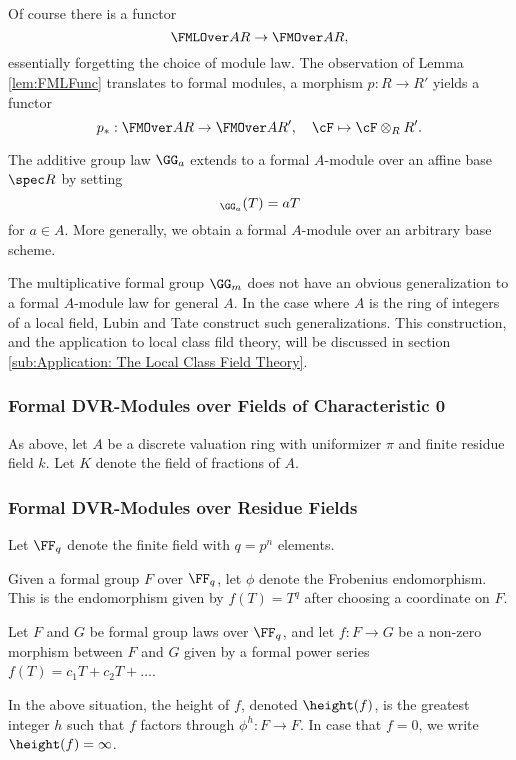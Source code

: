 Of course there is a functor 
\begin{equation*}
  \FMLOver AR \to \FMOver AR,
\end{equation*}
essentially forgetting the choice of module law. The observation of Lemma 
\ref{lem:FMLFunc} translates to formal modules, a morphism $p : R \to R'$ 
yields a functor 
\begin{equation*}
  p_*: \FMOver AR \to \FMOver A{R'}, \quad \cF \mapsto \cF \otimes_R R'.
\end{equation*}

\begin{xpl}
  The additive group law $\GG_a$ extends to a formal $A$-module over an affine base
  $\spec R$ by setting 
  \begin{equation*}
    [a]_{\GG_a}(T) = aT
  \end{equation*}
  for $a \in A$. More generally, we obtain a formal $A$-module over an arbitrary base
  scheme.

  The multiplicative formal group $\GG_m$ does not have an obvious 
  generalization to a formal $A$-module law for general $A$. In the case where $A$
  is the ring of integers of a local field, Lubin and Tate \cite{LubinTateFormalMult} 
  construct such generalizations. This construction, and the application to local
  class fild theory, will be discussed in section \ref{sub:Application: The
  Local Class Field Theory}.
\end{xpl}

\subsubsection{Formal DVR-Modules over Fields of Characteristic 0} %
\label{ssub:Formal DVR-Modules over Fields of Characteristic 0}
As above, let $A$ be a discrete valuation ring with uniformizer $\pi$ and finite 
residue field $k$. Let $K$ denote the field of fractions of $A$.

\subsubsection{Formal DVR-Modules over Residue Fields}
Let $\FF_q$ denote the finite field with $q = p^n$ elements.
\begin{defi}[Frobenius]
  Given a formal group $F$ over $\FF_q$, let $\phi$ denote the Frobenius
  endomorphism. This is the endomorphism given by $f(T) = T^q$ after choosing
  a coordinate on $F$.
\end{defi}

Let $F$ and $G$ be formal group laws over $\FF_q$, and let $f: F \to G$
be a non-zero morphism between $F$ and $G$ given by a formal power series $f(T) = c_1 T
+ c_2 T + \dots$.

\begin{defi}[Height]
  In the above situation, the height of $f$, denoted $\height(f)$, is the
  greatest integer $h$ such that $f$ factors through $\phi^h: F \to F$. 
  In case that $f = 0$, we write $\height(f) = \infty$. 
\end{defi}


